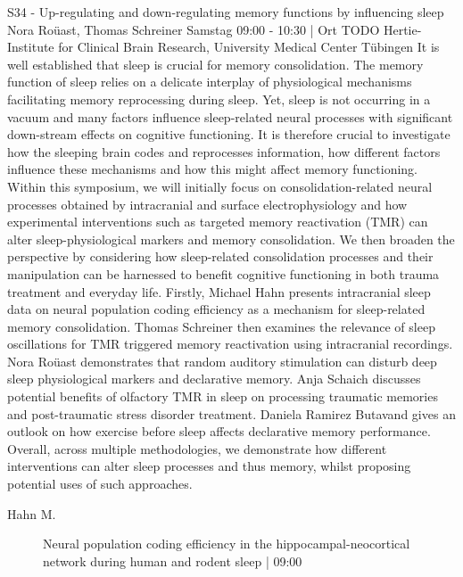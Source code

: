 
            \begin{symposium}
            {S34 - Up-regulating and down-regulating memory functions by influencing sleep}
            {Nora Roüast, Thomas Schreiner}
            {Samstag 09:00 - 10:30 | Ort TODO}
            {Hertie-Institute for Clinical Brain Research, University Medical Center Tübingen}
            It is well established that sleep is crucial for memory consolidation. The memory function of sleep relies on a delicate interplay of physiological mechanisms facilitating memory reprocessing during sleep. Yet, sleep is not occurring in a vacuum and many factors influence sleep-related neural processes with significant down-stream effects on cognitive functioning. It is therefore crucial to investigate how the sleeping brain codes and reprocesses information, how different factors influence these mechanisms and how this might affect memory functioning.
Within this symposium, we will initially focus on consolidation-related neural processes obtained by intracranial and surface electrophysiology and how experimental interventions such as targeted memory reactivation (TMR) can alter sleep-physiological markers and memory consolidation. We then broaden the perspective by considering how sleep-related consolidation processes and their manipulation can be harnessed to benefit cognitive functioning in both trauma treatment and everyday life.
Firstly, Michael Hahn presents intracranial sleep data on neural population coding efficiency as a mechanism for sleep-related memory consolidation. Thomas Schreiner then examines the relevance of sleep oscillations for TMR triggered memory reactivation using intracranial recordings. Nora Roüast demonstrates that random auditory stimulation can disturb deep sleep physiological markers and declarative memory. Anja Schaich discusses potential benefits of olfactory TMR in sleep on processing traumatic memories and post-traumatic stress disorder treatment. Daniela Ramirez Butavand gives an outlook on how exercise before sleep affects declarative memory performance.
Overall, across multiple methodologies, we demonstrate how different interventions can alter sleep processes and thus memory, whilst proposing potential uses of such approaches.
            \begin{description}    
            
                \item [ Hahn M.] Neural population coding efficiency in the hippocampal-neocortical network during human and rodent sleep \textcolor{mygray}{ | 09:00}    
                

\end{description}
\end{symposium}
